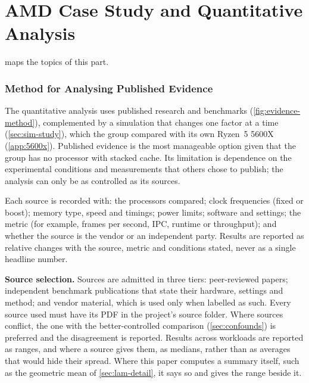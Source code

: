 \clearpage
\part{AMD Case Study and Quantitative Analysis}
\label{part:case-study}
 maps the topics of this part.



\section{Method for Analysing Published Evidence}
\label{sec:evidence-method}

The quantitative analysis uses published research and benchmarks (\cref{fig:evidence-method}), complemented by a simulation that changes one factor at a time (\cref{sec:sim-study}), which the group compared with its own Ryzen~5 5600X (\cref{app:5600x}). Published evidence is the most manageable option given that the group has no processor with stacked cache. Its limitation is dependence on the experimental conditions and measurements that others chose to publish; the analysis can only be as controlled as its sources.



Each source is recorded with: the processors compared; clock frequencies (fixed or boost); memory type, speed and timings; power limits; software and settings; the metric (for example, frames per second, IPC, runtime or throughput); and whether the source is the vendor or an independent party. Results are reported as relative changes with the source, metric and conditions stated, never as a single headline number.

\textbf{Source selection.} Sources are admitted in three tiers: peer-reviewed papers; independent benchmark publications that state their hardware, settings and method; and vendor material, which is used only when labelled as such. Every source used must have its PDF in the project's source folder. Where sources conflict, the one with the better-controlled comparison (\cref{sec:confounds}) is preferred and the disagreement is reported. Results across workloads are reported as ranges, and where a source gives them, as medians, rather than as averages that would hide their spread. Where this paper computes a summary itself, such as the geometric mean of \cref{sec:lam-detail}, it says so and gives the range beside it.

